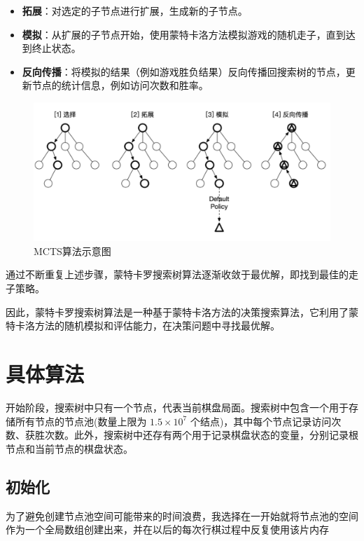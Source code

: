 \documentclass{article}
\begin{document}
\begin{spacing}{1.1}
\begin{itemize}
	\item \textbf{拓展}：对选定的子节点进行扩展，生成新的子节点。
	
	\item \textbf{模拟}：从扩展的子节点开始，使用蒙特卡洛方法模拟游戏的随机走子，直到达到终止状态。
	
	\item \textbf{反向传播}：将模拟的结果（例如游戏胜负结果）反向传播回搜索树的节点，更新节点的统计信息，例如访问次数和胜率。
	\end{itemize}

	\begin{figure}[h]
		\centering
		\includegraphics[width=0.8\linewidth]{pic/MCTS.png}
		\caption{MCTS算法示意图}
	\end{figure}
	通过不断重复上述步骤，蒙特卡罗搜索树算法逐渐收敛于最优解，即找到最佳的走子策略。
	
	因此，蒙特卡罗搜索树算法是一种基于蒙特卡洛方法的决策搜索算法，它利用了蒙特卡洛方法的随机模拟和评估能力，在决策问题中寻找最优解。
	
	
\section{具体算法}
	\hspace{1.4em}
	开始阶段，搜索树中只有一个节点，代表当前棋盘局面。搜索树中包含一个用于存储所有节点的节点池(数量上限为 $1.5\times 10^7$ 个结点)，其中每个节点记录访问次数、获胜次数。此外，搜索树中还存有两个用于记录棋盘状态的变量，分别记录根节点和当前节点的棋盘状态。
	\subsection{初始化}
	为了避免创建节点池空间可能带来的时间浪费，我选择在一开始就将节点池的空间作为一个全局数组创建出来，并在以后的每次行棋过程中反复使用该片内存

\end{spacing}
\end{document}
